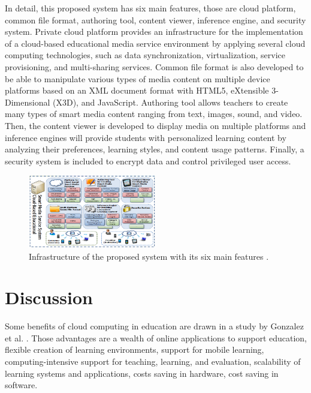 \documentclass[journal]{vgtc}
\begin{document}
  In detail, this proposed system has six main features, those are cloud platform, common file format, authoring tool, content viewer, inference engine, and security system. Private cloud platform provides an infrastructure for the implementation of a cloud-based educational media service environment by applying several cloud computing technologies, such as data synchronization, virtualization, service provisioning, and multi-sharing services. Common file format is also developed to be able to manipulate various types of media content on multiple device platforms based on an XML document format with HTML5, eXtensible 3-Dimensional (X3D), and JavaScript. Authoring tool allows teachers to create many types of smart media content ranging from text, images, sound, and video. Then, the content viewer is developed to display media on multiple platforms and inference engines will provide students with personalized learning content by analyzing their preferences, learning styles, and content usage patterns. Finally, a security system is included to encrypt data and control privileged user access.

  \begin{figure}[!b]
    \centering
    \includegraphics[width=0.5\textwidth]{content-oriented-feature}
    \caption{Infrastructure of the proposed system with its six main features \cite{jeong2013content}.}
    \label{feature}
  \end{figure}

\section{Discussion}
Some benefits of cloud computing in education are drawn in a study by Gonzalez et al. \cite{Gonzalez-Martinez2014}. Those advantages are a wealth of online applications to support education, flexible creation of learning environments, support for mobile learning, computing-intensive support for teaching, learning, and evaluation, scalability of learning systems and applications, costs saving in hardware, cost saving in software.
\end{document}
